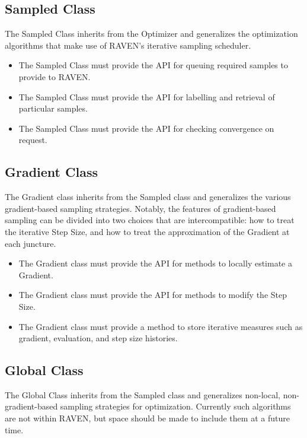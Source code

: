 \documentclass[11pt]{article}
\begin{document}
\subsection{Sampled Class}
The Sampled Class inherits from the Optimizer and generalizes the optimization algorithms that make
use of RAVEN's iterative sampling scheduler.
\begin{itemize}
  \item The Sampled Class must provide the API for queuing required samples to provide to RAVEN.
  \item The Sampled Class must provide the API for labelling and retrieval of particular samples.
  \item The Sampled Class must provide the API for checking convergence on request.
\end{itemize}

\subsection{Gradient Class}
The Gradient class inherits from the Sampled class and generalizes the various gradient-based
sampling strategies. Notably, the features of gradient-based sampling can be divided into two
choices that are intercompatible: how to treat the iterative Step Size, and how to treat the
approximation of the Gradient at each juncture.
\begin{itemize}
  \item The Gradient class must provide the API for methods to locally estimate a Gradient.
  \item The Gradient class must provide the API for methods to modify the Step Size.
  \item The Gradient class must provide a method to store iterative measures such as gradient, evaluation, and
  step size histories.
\end{itemize}

\subsection{Global Class}
The Global Class inherits from the Sampled class and generalizes non-local, non-gradient-based
sampling strategies for optimization. Currently such algorithms are not within RAVEN, but space
should be made to include them at a future time.


%
%
%
%
\end{document}
